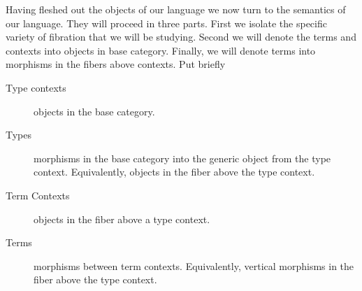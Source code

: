 Having fleshed out the objects of our language we now turn to the
semantics of our language. They will proceed in three parts. First we
isolate the specific variety of fibration that we will be
studying. Second we will denote the terms and contexts into objects in
base category. Finally, we will denote terms into morphisms in the
fibers above contexts. Put briefly
\begin{description}
\item[Type contexts] objects in the base category.
\item[Types] morphisms in the base category into the generic object
  from the type context. Equivalently, objects in the fiber above the
  type context.
\item[Term Contexts] objects in the fiber above a type context.
\item[Terms] morphisms between term contexts. Equivalently, vertical
  morphisms in the fiber above the type context.
\end{description}


